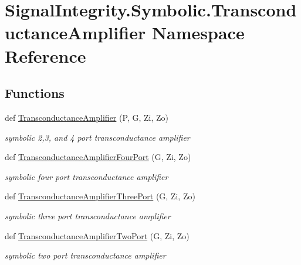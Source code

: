 \hypertarget{namespaceSignalIntegrity_1_1Symbolic_1_1TransconductanceAmplifier}{}\section{Signal\+Integrity.\+Symbolic.\+Transconductance\+Amplifier Namespace Reference}
\label{namespaceSignalIntegrity_1_1Symbolic_1_1TransconductanceAmplifier}
\subsection*{Functions}
\begin{DoxyCompactItemize}
\item 
def \hyperlink{namespaceSignalIntegrity_1_1Symbolic_1_1TransconductanceAmplifier_afa212f30aacb1b0116837793828b66c1}{Transconductance\+Amplifier} (P, G, Zi, Zo)
\begin{DoxyCompactList}\small\item\em symbolic 2,3, and 4 port transconductance amplifier \end{DoxyCompactList}\item 
def \hyperlink{namespaceSignalIntegrity_1_1Symbolic_1_1TransconductanceAmplifier_a64bea95894e157340ffa6f9a70ff8614}{Transconductance\+Amplifier\+Four\+Port} (G, Zi, Zo)
\begin{DoxyCompactList}\small\item\em symbolic four port transconductance amplifier \end{DoxyCompactList}\item 
def \hyperlink{namespaceSignalIntegrity_1_1Symbolic_1_1TransconductanceAmplifier_ab4373e07236c0e0f9cb981023d038c8a}{Transconductance\+Amplifier\+Three\+Port} (G, Zi, Zo)
\begin{DoxyCompactList}\small\item\em symbolic three port transconductance amplifier \end{DoxyCompactList}\item 
def \hyperlink{namespaceSignalIntegrity_1_1Symbolic_1_1TransconductanceAmplifier_aa20f41ca3fae9075e37e3c2eae49f54d}{Transconductance\+Amplifier\+Two\+Port} (G, Zi, Zo)
\begin{DoxyCompactList}\small\item\em symbolic two port transconductance amplifier \end{DoxyCompactList}\end{DoxyCompactItemize}


